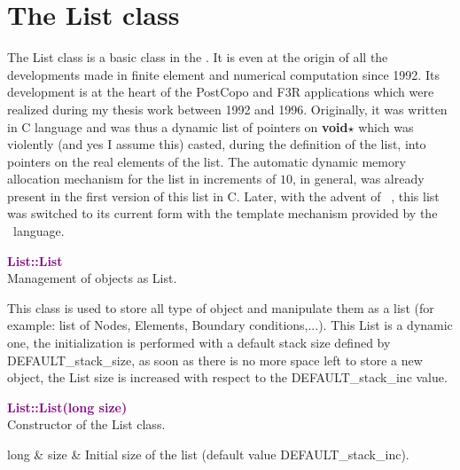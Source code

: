 
\section{The List class}

The List class is a basic class in the \DynELA. It is even at the origin of all the developments made in finite element and numerical computation since 1992. Its development is at the heart of the PostCopo and F3R applications which were realized during my thesis work between 1992 and 1996. Originally, it was written in C language and was thus a dynamic list of pointers on \textbf{void$\star$} which was violently (and yes I assume this) casted, during the definition of the list, into pointers on the real elements of the list. The automatic dynamic memory allocation mechanism for the list in increments of $10$, in general, was already present in the first version of this list in C. Later, with the advent of \Cpp~, this list was switched to its current form with the template mechanism provided by the \Cpp~language.

\textcolor{purple}{\textbf{List::List}}\label{List::List}\\
Management of objects as List.

This class is used to store all type of object and manipulate them as a list (for example: list of Nodes, Elements, Boundary conditions,...).
This List is a dynamic one, the initialization is performed with a default stack size defined by DEFAULT\_stack\_size, as soon as there is no more space left to store a new object,
the List size is increased with respect to the DEFAULT\_stack\_inc value.



\textcolor{purple}{\textbf{List::List(long size)}}\label{List::List(long size)}\\
Constructor of the List class.

\begin{tcolorbox}[width=\textwidth,myArgs,tabularx={ll|R}]
long & size & Initial size of the list (default value DEFAULT\_stack\_inc).
\end{tcolorbox}

